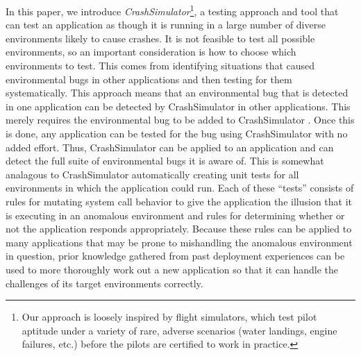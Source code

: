 In this paper, we introduce {\em CrashSimulator}\footnote{
Our approach is loosely inspired by flight simulators, which test pilot
aptitude under a variety of rare, adverse scenarios (water landings, 
engine failures, etc.) before the pilots are certified to work in practice.}, 
a testing approach
and tool that can test an application as though it is running in a large number
of diverse environments likely to cause crashes.  It is not 
feasible to test all possible environments, so an important consideration
is how to choose which environments to test.  This comes from identifying 
situations that caused environmental bugs in other applications and then
testing for them systematically.
This approach means that an environmental bug that is detected in one application can be 
detected by CrashSimulator in other applications.   This merely requires the 
environmental bug to be added to CrashSimulator . Once this is done, any application can
be tested for the bug using CrashSimulator with no added effort.  Thus,
CrashSimulator can be applied to an application and can detect the full 
suite of environmental bugs it is aware of.  This is somewhat analagous to
CrashSimulator automatically creating unit tests for all environments
in which the application could run.
Each of these ``tests'' consists of rules for
mutating system call behavior to give the application the illusion that it is
executing in an anomalous environment and rules for determining whether or not
the application responds appropriately.
Because these rules can be applied to many
applications that may be prone to mishandling the
anomalous environment in question, prior knowledge
gathered from past deployment experiences can be used to more thoroughly work
out a new application so that it can
handle the challenges of its target environments correctly.




